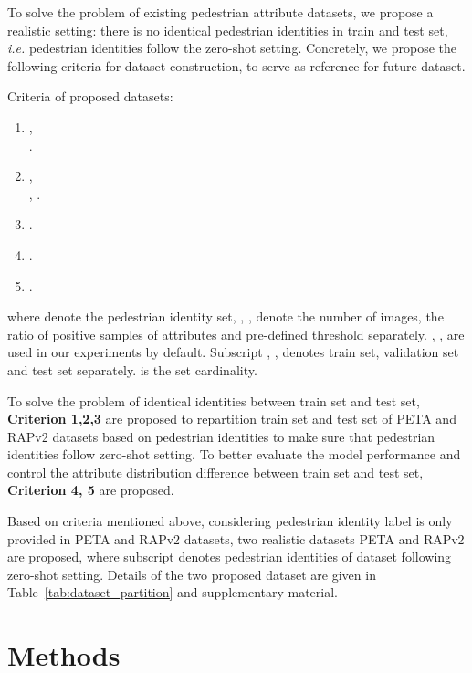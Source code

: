 \documentclass[runningheads]{llncs}
\begin{document}
To solve the problem of existing pedestrian attribute datasets, we propose a realistic setting: there is no identical pedestrian identities in train and test set, \textit{i.e.} pedestrian identities follow the zero-shot setting. Concretely, we propose the following criteria for dataset construction, to serve as reference for future dataset.
\begin{description}
    \item[Criteria of proposed datasets:]
\end{description}
\begin{center}
  \begin{minipage}{0.9\linewidth}
    \begin{enumerate}
    \item , \\     .
    \item , \\,  .
    \item  .
\item  .
    \item  .
    \end{enumerate}
  \end{minipage}
\end{center}
where  denote the pedestrian identity set, , ,  denote the number of images, the ratio of positive samples of attributes and pre-defined threshold separately. , ,  are used in our experiments by default. Subscript , ,  denotes train set, validation set and test set separately.  is the set cardinality.

To solve the problem of identical identities between train set and test set, \textbf{Criterion 1,2,3} are proposed to repartition train set and test set of PETA and RAPv2 datasets based on pedestrian identities to make sure that pedestrian identities follow zero-shot setting. To better evaluate the model performance and control the attribute distribution difference between train set and test set, \textbf{Criterion 4, 5} are proposed.

Based on criteria mentioned above, considering pedestrian identity label is only provided in PETA and RAPv2 datasets, two realistic datasets PETA\textsubscript{} and RAPv2\textsubscript{} are proposed, where subscript  denotes pedestrian identities of dataset following zero-shot setting. 
Details of the two proposed dataset are given in Table~\ref{tab:dataset_partition} and supplementary material.


\section{Methods} \label{method}
\end{document}
